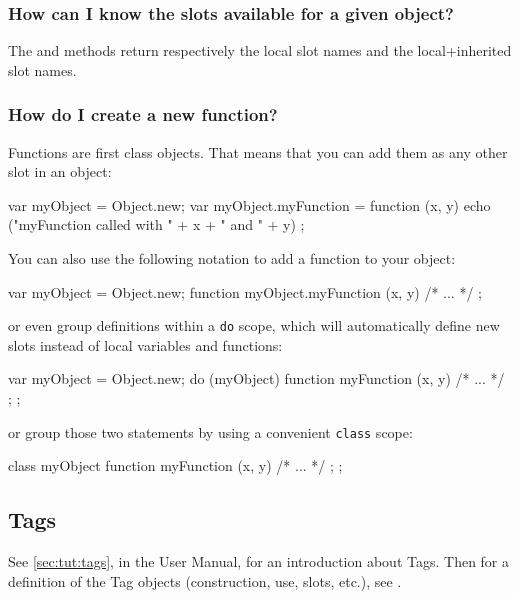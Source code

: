 \subsubsection{How can I know the slots available for a given object?}
The  and  methods
return respectively the local slot names and the local+inherited slot
names.

\subsubsection{How do I create a new function?}
Functions are first class objects. That means that you can add them as
any other slot in an object:

\begin{urbiunchecked}
var myObject = Object.new;
var myObject.myFunction = function (x, y)
  { echo ("myFunction called with " + x + " and " + y) };
\end{urbiunchecked}

You can also use the following notation to add a function to your
object:

\begin{urbiunchecked}
var myObject = Object.new;
function myObject.myFunction (x, y) { /* ... */ };
\end{urbiunchecked}

\noindent
or even group definitions within a \lstinline{do} scope, which will
automatically define new slots instead of local variables and
functions:

\begin{urbiunchecked}
var myObject = Object.new;
do (myObject)
{
  function myFunction (x, y) { /* ... */ };
};
\end{urbiunchecked}

\noindent
or group those two statements by using a convenient \lstinline{class}
scope:

\begin{urbiunchecked}
class myObject
{
  function myFunction (x, y) { /* ... */ };
};
\end{urbiunchecked}


\subsection{Tags}

See \autoref{sec:tut:tags}, in the \us User Manual, for an
introduction about Tags.  Then for a definition of the Tag objects
(construction, use, slots, etc.), see .

